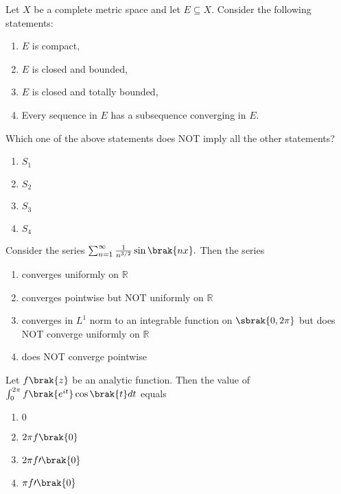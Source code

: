 \item Let $X$ be a complete metric space and let $E \subseteq X$. Consider the following statements:
  \begin{enumerate}
    \item $E$ is compact,
    \item $E$ is closed and bounded,
    \item $E$ is closed and totally bounded,
    \item Every sequence in $E$ has a subsequence converging in $E$.
  \end{enumerate}
  Which one of the above statements does NOT imply all the other statements?

  \begin{multicols}{4}
  \begin{enumerate}
    \item $S_1$
    \item $S_2$
    \item $S_3$
    \item $S_4$
  \end{enumerate}
  \end{multicols}

\item Consider the series
  $\sum_{n=1}^\infty \frac{1}{n^{3/2}}\sin\brak{nx}.$
  Then the series

  \begin{enumerate}
    \item converges uniformly on $\mathbb{R}$
    \item converges pointwise but NOT uniformly on $\mathbb{R}$
    \item converges in $L^1$ norm to an integrable function on $\sbrak{0,2\pi}$ but does NOT
      converge uniformly on $\mathbb{R}$
    \item does NOT converge pointwise
  \end{enumerate}

\item Let $f\brak{z}$ be an analytic function. Then the value of
  $\int_{0}^{2\pi} f\brak{e^{it}} \cos\brak{t} dt$
  equals

  \begin{enumerate}
    \item $0$
    \item $2\pi f\brak{0}$
    \item $2\pi f\prime\brak{0}$
    \item $\pi f\prime\brak{0}$
  \end{enumerate}

